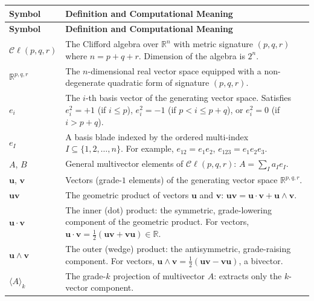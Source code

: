 \documentclass[manuscript, nonacm, review=false]{acmart}
\theoremstyle{definition}
\theoremstyle{plain}
\newcommand{\R}{\mathbb{R}}
\newcommand{\Cl}{\mathcal{C}\!\ell}
\begin{document}
\begin{longtable}{@{}p{2.8cm}p{10cm}@{}}
\toprule
\textbf{Symbol} & \textbf{Definition and Computational Meaning} \\
\midrule
\endfirsthead
\toprule
\textbf{Symbol} & \textbf{Definition and Computational Meaning} \\
\midrule
\endhead
\bottomrule
\endfoot

$\Cl(p,q,r)$ & The Clifford algebra over $\R^n$ with metric signature $(p,q,r)$ where $n = p+q+r$. Dimension of the algebra is $2^n$. \\

$\R^{p,q,r}$ & The $n$-dimensional real vector space equipped with a non-degenerate quadratic form of signature $(p,q,r)$. \\

$e_i$ & The $i$-th basis vector of the generating vector space. Satisfies $e_i^2 = +1$ (if $i \leq p$), $e_i^2 = -1$ (if $p < i \leq p+q$), or $e_i^2 = 0$ (if $i > p+q$). \\

$e_I$ & A basis blade indexed by the ordered multi-index $I \subseteq \{1, 2, \ldots, n\}$. For example, $e_{12} = e_1 e_2$, $e_{123} = e_1 e_2 e_3$. \\

$A$, $B$ & General multivector elements of $\Cl(p,q,r)$: $A = \sum_I a_I e_I$. \\

$\mathbf{u}$, $\mathbf{v}$ & Vectors (grade-$1$ elements) of the generating vector space $\R^{p,q,r}$. \\

$\mathbf{u}\mathbf{v}$ & The geometric product of vectors $\mathbf{u}$ and $\mathbf{v}$: $\mathbf{u}\mathbf{v} = \mathbf{u} \cdot \mathbf{v} + \mathbf{u} \wedge \mathbf{v}$. \\

$\mathbf{u} \cdot \mathbf{v}$ & The inner (dot) product: the symmetric, grade-lowering component of the geometric product. For vectors, $\mathbf{u} \cdot \mathbf{v} = \frac{1}{2}(\mathbf{u}\mathbf{v} + \mathbf{v}\mathbf{u}) \in \R$. \\

$\mathbf{u} \wedge \mathbf{v}$ & The outer (wedge) product: the antisymmetric, grade-raising component. For vectors, $\mathbf{u} \wedge \mathbf{v} = \frac{1}{2}(\mathbf{u}\mathbf{v} - \mathbf{v}\mathbf{u})$, a bivector. \\

$\langle A \rangle_k$ & The grade-$k$ projection of multivector $A$: extracts only the $k$-vector component. \\


\end{longtable}
\end{document}
